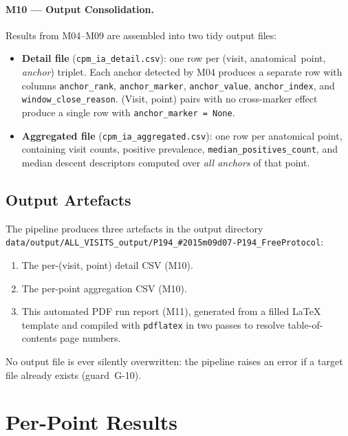 \documentclass[a4paper,11pt]{article}
\begin{document}
\paragraph{M10 --- Output Consolidation.}
Results from M04--M09 are assembled into two tidy output files:
\begin{itemize}
  \item \textbf{Detail file} (\texttt{cpm\_ia\_detail.csv}): one row per
        (visit, anatomical~point, \emph{anchor}) triplet. Each anchor detected by M04
        produces a separate row with columns \texttt{anchor\_rank},
        \texttt{anchor\_marker}, \texttt{anchor\_value}, \texttt{anchor\_index},
        and \texttt{window\_close\_reason}.
        (Visit, point) pairs with no cross-marker effect produce a single row with
        \texttt{anchor\_marker = None}.
  \item \textbf{Aggregated file} (\texttt{cpm\_ia\_aggregated.csv}): one row per
        anatomical point, containing visit counts, positive prevalence,
        \texttt{median\_positives\_count}, and median descent descriptors computed over
        \emph{all anchors} of that point.
\end{itemize}

\subsection{Output Artefacts}

The pipeline produces three artefacts in the output directory \texttt{data/output/ALL\_VISITS\_output/P194\_\#2015m09d07-P194\_FreeProtocol}:
\begin{enumerate}
  \item The per-(visit, point) detail CSV (M10).
  \item The per-point aggregation CSV (M10).
  \item This automated PDF run report (M11), generated from a filled \LaTeX{} template
        and compiled with \texttt{pdflatex} in two passes to resolve table-of-contents
        page numbers.
\end{enumerate}
No output file is ever silently overwritten: the pipeline raises an error if a target
file already exists (guard~G-10).

\section{Per-Point Results}
\end{document}

